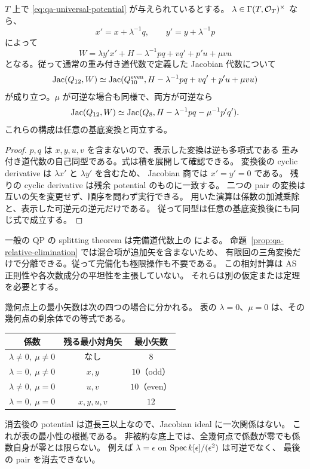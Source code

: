 \begin{proposition}[任意の底上の有限な消去]
\label{prop:qa-relative-elimination}
$T$ 上で \eqref{eq:qa-universal-potential} が与えられているとする。
$\lambda\in\Gamma(T,\mathcal O_T)^\times$ なら、
\[
 x'=x+\lambda^{-1}q,\qquad y'=y+\lambda^{-1}p
\]
によって
\begin{equation}
\label{eq:qa-one-pair-elimination}
 W=\lambda y'x'+H-\lambda^{-1}pq+vq'+p'u+\mu vu
\end{equation}
となる。従って通常の重み付き道代数で定義した Jacobian 代数について
\[
 \operatorname{Jac}(Q_{12},W)
 \simeq
 \operatorname{Jac}(Q_{10}^{\mathrm{even}},H-\lambda^{-1}pq+vq'+p'u+\mu vu)
\]
が成り立つ。$\mu$ が可逆な場合も同様で、両方が可逆なら
\begin{equation}
\label{eq:qa-two-pair-elimination}
 \operatorname{Jac}(Q_{12},W)
 \simeq\operatorname{Jac}(Q_8,H-\lambda^{-1}pq-\mu^{-1}p'q').
\end{equation}
これらの構成は任意の基底変換と両立する。
\end{proposition}

\begin{proof}
$p,q$ は $x,y,u,v$ を含まないので、表示した変換は逆も多項式である
重み付き道代数の自己同型である。式は積を展開して確認できる。
変換後の cyclic derivative は $\lambda x'$ と $\lambda y'$ を含むため、
Jacobian 商では $x'=y'=0$ である。
残りの cyclic derivative は残余 potential のものに一致する。
二つの pair の変換は互いの矢を変更せず、順序を問わず実行できる。
用いた演算は係数の加減乗除と、表示した可逆元の逆元だけである。
従って同型は任意の基底変換後にも同じ式で成立する。
\end{proof}

\begin{remark}
一般の QP の splitting theorem は完備道代数上の
\cite[Theorem 4.6]{DWZ2008} による。
命題~\ref{prop:qa-relative-elimination} では混合項が追加矢を含まないため、
有限回の三角変換だけで分離できる。従って完備化も極限操作も不要である。
この相対計算は AS 正則性や各次数成分の平坦性を主張していない。
それらは別の仮定または定理を必要とする。
\end{remark}

幾何点上の最小矢数は次の四つの場合に分かれる。
表の $\lambda=0$、$\mu=0$ は、その幾何点の剰余体での等式である。
\begin{center}
\begin{tabular}{c|c|c}
係数 & 残る最小対角矢 & 最小矢数 \\
\hline
$\lambda\ne0,\ \mu\ne0$ & なし & $8$ \\
$\lambda=0,\ \mu\ne0$ & $x,y$ & $10$（odd）\\
$\lambda\ne0,\ \mu=0$ & $u,v$ & $10$（even）\\
$\lambda=0,\ \mu=0$ & $x,y,u,v$ & $12$
\end{tabular}
\end{center}
消去後の potential は道長三以上なので、Jacobian ideal に一次関係はない。
これが表の最小性の根拠である。
非被約な底上では、全幾何点で係数が零でも係数自身が零とは限らない。
例えば $\lambda=\epsilon$ on $\operatorname{Spec}k[\epsilon]/(\epsilon^2)$ は可逆でなく、
最後の pair を消去できない。

